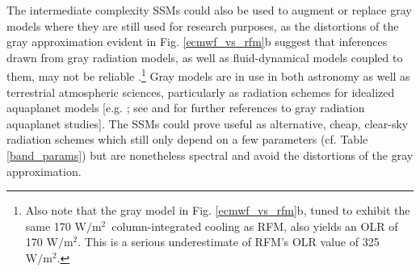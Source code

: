 \documentclass{ametsoc}
\newcommand{\beqn}{\begin{equation}}
\newcommand{\eeqn}{\end{equation}}
\newcommand{\n}{\nonumber}
\newcommand{\eqnref}[1]{(\ref{#1})}
\newcommand{\kg}{\ensuremath{\mathrm{kg}}}
\newcommand{\meter}{\ensuremath{\mathrm{m}}}
\newcommand{\Kelvin}{\ensuremath{\mathrm{K}}}
\newcommand{\Wmsq}{\ensuremath{\mathrm{W/m^2}}}
\newcommand{\cminverse}{\ensuremath{\mathrm{cm^{-1}}}}
\newcommand{\Rv}{\ensuremath{R_v}}
\newcommand{\Ts}{\ensuremath{T_\mathrm{s}}}
\newcommand{\RH}{\ensuremath{\mathrm{RH}}}
\newcommand{\pref}{\ensuremath{p_{\mathrm{ref}}}}
\newcommand{\WVP}{\ensuremath{\mathrm{WVP}}}
\newcommand{\Tav}{\ensuremath{T_{\mathrm{av}}}}
\newcommand{\Tinf}{\ensuremath{T_\infty}}
\newcommand{\kappamin}{\ensuremath{\kappa_{\mathrm{min}}}}
\begin{document}
The intermediate complexity  SSMs  could also be used  to augment or replace gray models where they are still used for research purposes, as the distortions of the gray approximation evident  in Fig. \ref{ecmwf_vs_rfm}b suggest that inferences drawn from gray radiation models, as well as fluid-dynamical models coupled to them, may not be reliable \citep[e.g.][]{tan2019}.\footnote{Also note that the gray model in Fig. \ref{ecmwf_vs_rfm}b,  tuned to exhibit the same 170 \Wmsq\ column-integrated cooling as RFM, also yields an OLR of 170 \Wmsq. This is a serious underestimate of RFM's OLR value of  325 \Wmsq.} Gray models are in use in both astronomy \citep[e.g.][]{parmentier2014,rauscher2012,robinson2012,heng2011} as well as terrestrial atmospheric sciences, particularly as radiation schemes for idealized aquaplanet models [e.g. \cite{vallis2015, frierson2006};  see  \cite{maher2019} and  \cite{jeevanjee2017a} for further references to gray radiation aquaplanet studies]. The SSMs could prove useful as alternative, cheap, clear-sky radiation schemes which still only depend on a few parameters (cf. Table \ref{band_params}) but are nonetheless spectral  and avoid the distortions of the gray approximation.



\end{document}
